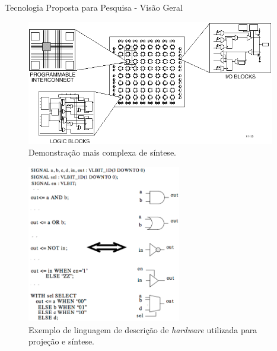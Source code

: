 \documentclass[aspectratio=169]{beamer}
\begin{document}
\begin{frame}{Tecnologia Proposta para Pesquisa - Visão Geral}
	\begin{figure}[H]
		\centering
		\includegraphics[width=0.97\textwidth]{img/demonstracao_2.png}
		\caption{Demonstração mais complexa de síntese.}
	\end{figure}
\end{frame}

\begin{frame}
	\begin{figure}[H]
		\centering
		\includegraphics[width=0.6\textwidth]{img/linguagem.png}
		\caption{Exemplo de linguagem de descrição de \textit{hardware} utilizada para projeção e síntese.}
	\end{figure}
\end{frame}
\end{document}
